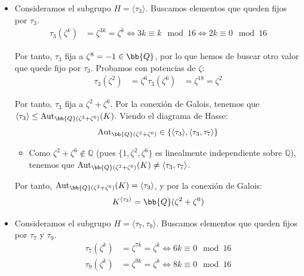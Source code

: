 \begin{ejemplo}
\begin{itemize}
\begin{itemize}
            Por tanto, $\Aut_{\bb{Q}(\zeta^4)}(K) = \langle \tau_5\rangle$, y por la conexión de Galois:
            \begin{equation*}
                K^{\langle \tau_5\rangle} = \bb{Q}(\zeta^4)
            \end{equation*}

            \item Consideramos el subgrupo $H = \langle \tau_3\rangle$. Buscamos elementos que queden fijos por $\tau_3$.
            \begin{align*}
                \tau_3(\zeta^k) &= \zeta^{3k} = \zeta^k \iff 3k \equiv k \mod 16 \iff 2k \equiv 0 \mod 16
            \end{align*}

            Por tanto, $\tau_3$ fija a $\zeta^8=-1\in \bb{Q}$, por lo que hemos de buscar otro valor que quede fijo por $\tau_3$. Probamos con potencias de $\zeta$:
            \begin{align*}
                \tau_3(\zeta^2) &= \zeta^6
                \tau_3(\zeta^6) &= \zeta^{18} = \zeta^2
            \end{align*}

            Por tanto, $\tau_3$ fija a $\zeta^2+\zeta^6$. Por la conexión de Galois, tenemos que $\langle \tau_3\rangle\leq \Aut_{\bb{Q}(\zeta^2+\zeta^6)}(K)$. Viendo el diagrama de Hasse:
            \begin{equation*}
                \Aut_{\bb{Q}(\zeta^2+\zeta^6)} \in \{\langle \tau_3\rangle, \langle \tau_3, \tau_7\rangle\}
            \end{equation*}
            \begin{itemize}
                \item Como $\zeta^2+\zeta^6\notin \mathbb{Q}$ (pues $\{1,\zeta^2,\zeta^6\}$ es linealmente independiente sobre $\mathbb{Q}$), tenemos que $\Aut_{\bb{Q}(\zeta^2+\zeta^6)}(K)\neq \langle \tau_3, \tau_7\rangle$.
            \end{itemize}

            Por tanto, $\Aut_{\bb{Q}(\zeta^2+\zeta^6)}(K) = \langle \tau_3\rangle$, y por la conexión de Galois:
            \begin{equation*}
                K^{\langle \tau_3\rangle} = \bb{Q}(\zeta^2+\zeta^6)
            \end{equation*}

            \item Consideramos el subgrupo $H = \langle \tau_7, \tau_9\rangle$. Buscamos elementos que queden fijos por $\tau_7$ y $\tau_9$.
            \begin{align*}
                \tau_7(\zeta^k) &= \zeta^{7k} = \zeta^k \iff 6k \equiv 0 \mod 16 \\
                \tau_9(\zeta^k) &= \zeta^{9k} = \zeta^k \iff 8k \equiv 0 \mod 16
            \end{align*}


\end{itemize}
\end{itemize}
\end{ejemplo}
